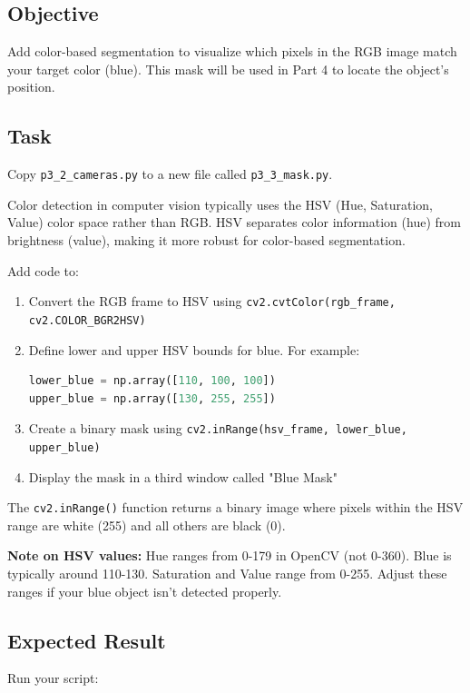\documentclass[11pt,a4paper]{article}
\begin{document}
\subsection*{Objective}

Add color-based segmentation to visualize which pixels in the RGB image match your target color (blue). This mask will be used in Part 4 to locate the object's position.

\subsection*{Task}

Copy \texttt{p3\_2\_cameras.py} to a new file called \texttt{p3\_3\_mask.py}.

Color detection in computer vision typically uses the HSV (Hue, Saturation, Value) color space rather than RGB. HSV separates color information (hue) from brightness (value), making it more robust for color-based segmentation.

Add code to:
\begin{enumerate}
    \item Convert the RGB frame to HSV using \texttt{cv2.cvtColor(rgb\_frame, cv2.COLOR\_BGR2HSV)}
    \item Define lower and upper HSV bounds for blue. For example:
    \begin{lstlisting}[language=Python]
lower_blue = np.array([110, 100, 100])
upper_blue = np.array([130, 255, 255])
    \end{lstlisting}
    \item Create a binary mask using \texttt{cv2.inRange(hsv\_frame, lower\_blue, upper\_blue)}
    \item Display the mask in a third window called "Blue Mask"
\end{enumerate}

The \texttt{cv2.inRange()} function returns a binary image where pixels within the HSV range are white (255) and all others are black (0).

\textbf{Note on HSV values:} Hue ranges from 0-179 in OpenCV (not 0-360). Blue is typically around 110-130. Saturation and Value range from 0-255. Adjust these ranges if your blue object isn't detected properly.

\subsection*{Expected Result}

Run your script:
\end{document}
